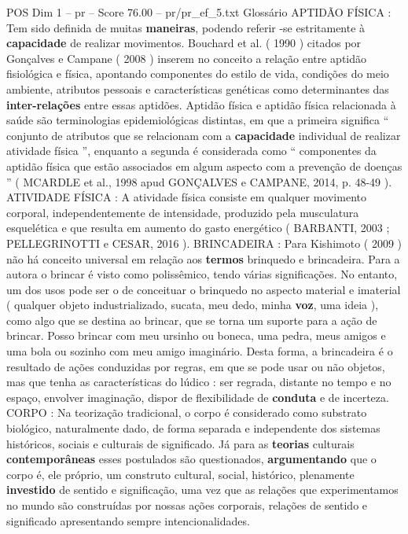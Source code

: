 \begin{textsample}{POS Dim 1 – pr – Score 76.00 – pr/pr\_ef\_5.txt}  \label{ex:f1_pos_027}
Glossário APTIDÃO FÍSICA : Tem sido definida de muitas \textbf{maneiras}, podendo referir -se estritamente à \textbf{capacidade} de realizar movimentos.
Bouchard et al. ( 1990 ) citados por Gonçalves e Campane ( 2008 ) inserem no conceito a relação entre aptidão fisiológica e física, apontando componentes do estilo de vida, condições do meio ambiente, atributos pessoais e características genéticas como determinantes das \textbf{inter-relações} entre essas aptidões.
Aptidão física e aptidão física relacionada à saúde são terminologias epidemiológicas distintas, em que a primeira significa “ conjunto de atributos que se relacionam com a \textbf{capacidade} individual de realizar atividade física ”, enquanto a segunda é considerada como “ componentes da aptidão física que estão associados em algum aspecto com a prevenção de doenças ” ( MCARDLE et al., 1998 apud GONÇALVES e CAMPANE, 2014, p. 48-49 ).
ATIVIDADE FÍSICA : A atividade física consiste em qualquer movimento corporal, independentemente de intensidade, produzido pela musculatura esquelética e que resulta em aumento do gasto energético ( BARBANTI, 2003 ; PELLEGRINOTTI e CESAR, 2016 ).
BRINCADEIRA : Para Kishimoto ( 2009 ) não há conceito universal em relação aos \textbf{termos} brinquedo e brincadeira.
Para a autora o brincar é visto como polissêmico, tendo várias significações.
No entanto, um dos usos pode ser o de conceituar o brinquedo no aspecto material e imaterial ( qualquer objeto industrializado, sucata, meu dedo, minha \textbf{voz}, uma ideia ), como algo que se destina ao brincar, que se torna um suporte para a ação de brincar.
Posso brincar com meu ursinho ou boneca, uma pedra, meus amigos e uma bola ou sozinho com meu amigo imaginário.
Desta forma, a brincadeira é o resultado de ações conduzidas por regras, em que se pode usar ou não objetos, mas que tenha as características do lúdico : ser regrada, distante no tempo e no espaço, envolver imaginação, dispor de flexibilidade de \textbf{conduta} e de incerteza.
CORPO : Na teorização tradicional, o corpo é considerado como substrato biológico, naturalmente dado, de forma separada e independente dos sistemas históricos, sociais e culturais de significado.
Já para as \textbf{teorias} culturais \textbf{contemporâneas} esses postulados são questionados, \textbf{argumentando} que o corpo é, ele próprio, um construto cultural, social, histórico, plenamente \textbf{investido} de sentido e significação, uma vez que as relações que experimentamos no mundo são construídas por nossas ações corporais, relações de sentido e significado apresentando sempre intencionalidades.

\end{textsample}
